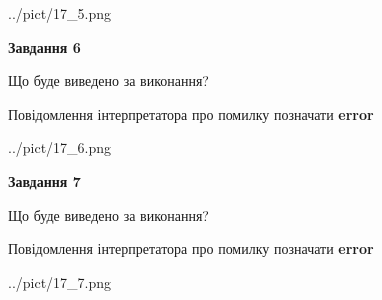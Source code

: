 \documentclass[10pt, ukrainian]{article}
\begin{document}
{\begin {large}
\begin{center}
	{../pict/17_5.png}
\end{center}
\newpage

{\begin {center}\textbf{Завдання 6}\end {center}}\par
Що буде виведено за виконання? \par
Повідомлення інтерпретатора про помилку позначати \textbf{error}

\begin{center}
	{../pict/17_6.png}
\end{center}
\newpage

{\begin {center}\textbf{Завдання 7}\end {center}}\par
Що буде виведено за виконання? \par
Повідомлення інтерпретатора про помилку позначати \textbf{error}

\begin{center}
	{../pict/17_7.png}
\end{center}
\newpage

\end {large}}
\end{document}
